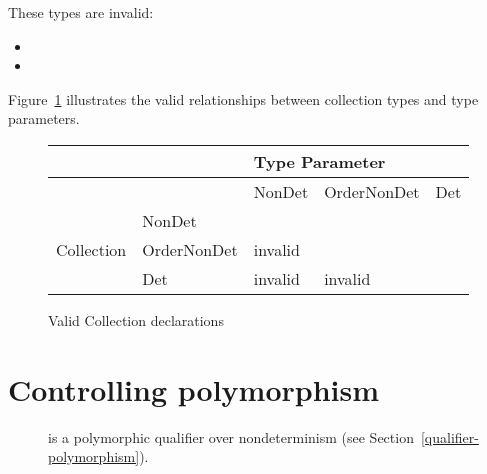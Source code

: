 These types are invalid:
  \begin{itemize}
    \item {}
    \item {}
  \end{itemize}

Figure~\ref{fig-determinism-collections} illustrates the valid
relationships between collection types and type parameters.

\begin{figure}
  \centering
  \begin{tabular}{|l|l|l|l|l|}
    \hline
    &   &  \multicolumn{3}{l|}{Type Parameter}                                                                       \\ \hline
    &             & NonDet                                     & OrderNonDet              & Det \\ \cline{2-5}
              & NonDet &                                                 &                          &     \\ \cline{2-5}
Collection    & OrderNonDet &   invalid  &                          &     \\ \cline{2-5}
              & Det         &   invalid               &    invalid  &     \\ \hline
  \end{tabular}
  \caption{Valid Collection declarations}
  \label{fig-determinism-collections}
\end{figure}





\section{Controlling polymorphism\label{determinism-polymorphism}}

\begin{description}
\item[] is a
  polymorphic qualifier over nondeterminism (see Section~\ref{qualifier-polymorphism}).
\end{description}

